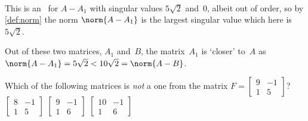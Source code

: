\begin{example}
\begin{enumerate}
\begin{enumerate}
\begin{solution}
\begin{eqnarray*}
\end{eqnarray*}
This is an \svd\ for \(A-A_1\) with singular values \(5\sqrt2\) and~\(0\), albeit out of order, so by \cref{def:norm} the norm \(\norm{A-A_1}\) is the largest singular value which here is~\(5\sqrt2\).
\end{solution}
\end{enumerate}
Out of these two matrices, \(A_1\) and~\(B\), the matrix~\(A_1\) is `closer' to~\(A\) as \(\norm{A-A_1}=5\sqrt2<10\sqrt2=\norm{A-B}\).
\end{enumerate}
\end{example}




\begin{activity}
Which of the following matrices is \emph{not} a  one from the matrix \(F=\begin{bmatrix} 9&-1\\1&5 \end{bmatrix}\)?
{\(\begin{bmatrix} 8&-1\\1&5 \end{bmatrix}\)}
{\(\begin{bmatrix} 9&-1\\1&6 \end{bmatrix}\)}
{\(\begin{bmatrix} 10&-1\\1&6 \end{bmatrix}\)}
\end{activity}





